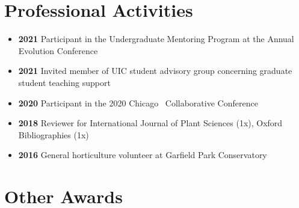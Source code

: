 \documentclass[]{article}
\begin{document}
\section{\fontsize{16}{48}\selectfont Professional Activities}



\begin{itemize}[label=$\mathwitch*$]
\item{\textbf{2021} Participant in the Undergraduate Mentoring Program at the Annual Evolution Conference}
\item{\textbf{2021} Invited member of UIC student advisory group concerning graduate student teaching support}
\item{\textbf{2020} Participant in the 2020 Chicago \faRProject\ Collaborative Conference \href{https://chircollab.github.io/}{\faLink}}
\item{\textbf{2018} Reviewer for International Journal of Plant Sciences (1x), Oxford Bibliographies (1x)}
\item{\textbf{2016} General horticulture volunteer at Garfield Park Conservatory \href{https://garfieldconservatory.org/}{\faLink}}
\end{itemize}

\vspace{1mm}



\section{\fontsize{16}{48}\selectfont Other Awards}
\end{document}
